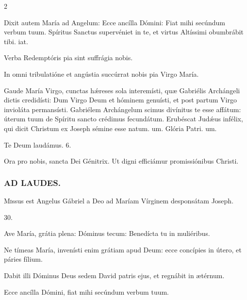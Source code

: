 \documentclass[9pt,twoside]{extarticle}
\begin{document}
\begin{multicols}{2}
\begin{tightlist}{}
\item {} Dixit autem María ad Angelum: Ecce ancílla Dómini: \textred{*} Fiat mihi secúndum verbum tuum.  Spíritus Sanctus supervéniet in te, et virtus Altíssimi obumbrábit tibi. iat.
\item {} Verba Redemptóris pia sint suffrágia nobis.
\item {} In omni tribulatióne et angústia succúrrat nobis pia Virgo María.
\item {} Gaude María Virgo, cunctas hǽreses sola interemísti, quæ Gabriélis Archángeli dictis credidísti: \textred{*} Dum Virgo Deum et hóminem genuísti, et post partum Virgo invioláta permansísti.  Gabriélem Archángelum scimus divínitus te esse affátum: úterum tuum de Spíritu sancto crédimus fecundátum. Erubéscat Judǽus infélix, qui dicit Christum ex Joseph sémine esse natum. um. Glória Patri. um.
\item Te Deum laudámus. 6.
\item {} Ora pro nobis, sancta Dei Génitrix.  Ut digni efficiámur promissiónibus Christi.
\end{tightlist}

\subsubsection*{\center \textsc{AD LAUDES.}}
\begin{center}\end{center}
\lettrine{M}issus est Angelus Gábriel a Deo ad Maríam Vírginem desponsátam Joseph.

\begin{tightlist}{}
\item {} 30.
\item {} Ave María, grátia plena: Dóminus tecum: Benedícta tu in muliéribus.
\item {} Ne tímeas María, invenísti enim grátiam apud Deum: ecce concípies in útero, et páries fílium.
\item {} Dabit illi Dóminus Deus sedem David patris ejus, et regnábit in ætérnum.
\item {} Ecce ancílla Dómini, fiat mihi secúndum verbum tuum.
\end{tightlist}


\end{multicols}
\end{document}

